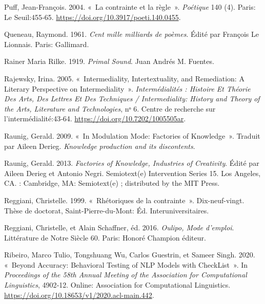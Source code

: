 \begin{CSLReferences}{1}{0}
\leavevmode{}%
Puff, Jean-François. 2004. {«~{La contrainte et la r{è}gle}~»}.
\emph{Po{é}tique} 140 (4). {Paris}: {Le Seuil}:455‑65.
\url{https://doi.org/10.3917/poeti.140.0455}.

\leavevmode{}%
Queneau, Raymond. 1961. \emph{{Cent mille milliards de po{è}mes}}. Édité
par François Le Lionnais. {Paris}: {Gallimard}.

\leavevmode{}%
Rainer Maria Rilke. 1919. \emph{Primal {Sound}}. {Juan Andr{é}s M.
Fuentes}.

\leavevmode{}%
Rajewsky, Irina. 2005. {«~Intermediality, {Intertextuality}, and
{Remediation}: {A Literary Perspective} on {Intermediality}~»}.
\emph{Interm{é}dialit{é}s : Histoire Et Th{é}orie Des Arts, Des Lettres
Et Des Techniques / Intermediality: History and Theory of the Arts,
Literature and Technologies}, nᵒ 6. {Centre de recherche sur
l'interm{é}dialit{é}}:43‑64. \url{https://doi.org/10.7202/1005505ar}.

\leavevmode{}%
Raunig, Gerald. 2009. {«~In {Modulation Mode}: {Factories} of
{Knowledge}~»}. Traduit par Aileen Derieg. \emph{Knowledge production
and its discontents}.

\leavevmode{}%
Raunig, Gerald. 2013. \emph{Factories of {Knowledge}, {Industries} of
{Creativity}}. Édité par Aileen Derieg et Antonio Negri. Semiotext(e)
Intervention Series 15. {Los Angeles, CA. : Cambridge, MA}:
{Semiotext(e) ; distributed by the MIT Press}.

\leavevmode{}%
Reggiani, Christelle. 1999. {«~{Rh{é}toriques de la contrainte}~»}.
{Dix-neuf-vingt}. Thèse de doctorat, {Saint-Pierre-du-Mont}: {É}d.
Interuniversitaires.

\leavevmode{}%
Reggiani, Christelle, et Alain Schaffner, éd. 2016. \emph{Oulipo, Mode
d'emploi}. Litt{é}rature de Notre Si{è}cle 60. {Paris}: {Honor{é}
Champion {é}diteur}.

\leavevmode{}%
Ribeiro, Marco Tulio, Tongshuang Wu, Carlos Guestrin, et Sameer Singh.
2020. {«~Beyond {Accuracy}: {Behavioral Testing} of {NLP Models} with
{CheckList}~»}. In \emph{Proceedings of the 58th {Annual Meeting} of the
{Association} for {Computational Linguistics}}, 4902‑12. {Online}:
{Association for Computational Linguistics}.
\url{https://doi.org/10.18653/v1/2020.acl-main.442}.


\end{CSLReferences}
